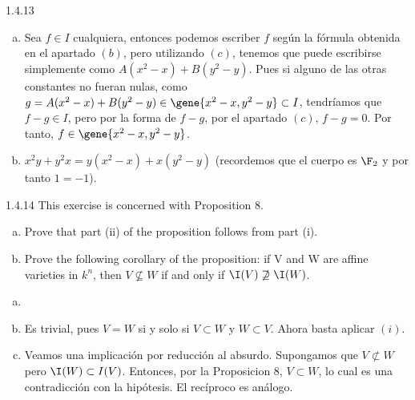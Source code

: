 \documentclass[twoside]{article}
\begin{document}
\begin{ejercicio}{1.4.13}
\begin{solucion}
\begin{enumerate}[a.]
\item Sea $f\in I$ cualquiera, entonces podemos escriber $f$ según la fórmula obtenida en el apartado $(b)$, pero utilizando $(c)$, tenemos que puede escribirse simplemente como $A(x^2-x)+B(y^2-y)$. Pues si alguno de las otras constantes no fueran nulas, como $g = A(x^2-x)+B(y^2-y)\in \gene{x^2-x,y^2-y} \subset I$, tendríamos que $f-g\in I$, pero por la forma de $f-g$, por el apartado $(c)$, $f-g=0$. Por tanto, $f\in \gene{x^2-x,y^2-y}$.
\item $x^2y + y^2x=y(x^2-x)+x(y^2-y)$ (recordemos que el cuerpo es $\F_2$ y por tanto $1=-1$).
\end{enumerate}
\end{solucion} 
\end{ejercicio}
\newpage
\begin{ejercicio}{1.4.14}
This exercise is concerned with Proposition 8.
\begin{enumerate}[a.]
\item Prove that part (ii) of the proposition follows from part (i).
\item Prove the following corollary of the proposition: if V and W are affine varieties in $k^n$, then $V \not\subseteq W$ if and only if $\I(V)\not\supseteq\I(W)$.
\end{enumerate}
\end{ejercicio}
\begin{solucion}
\begin{enumerate}[a.]
\item[]
\item Es trivial, pues $V=W$ si y solo si $V\subset W$ y $W \subset V$. Ahora basta aplicar $(i)$.
\item Veamos una implicación por reducción al absurdo. Supongamos que $V\not \subset W$ pero $\I(W)\subset I(V)$. Entonces, por la Proposicion 8, $V\subset W$, lo cual es una contradicción con la hipótesis. El recíproco es análogo.
\end{enumerate}
\end{solucion}
\newpage
\end{document}
